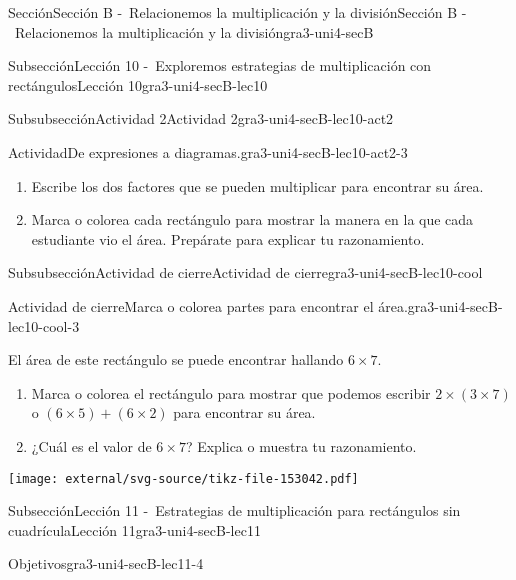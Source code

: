 \documentclass[twoside,14pt,]{extarticle}
\begin{document}
\begin{sectionptx}{Sección}{Sección B -~Relacionemos la multiplicación y la división}{}{Sección B -~Relacionemos la multiplicación y la división}{}{}{gra3-uni4-secB}
\begin{subsectionptx}{Subsección}{Lección 10 -~Exploremos estrategias de multiplicación con rectángulos}{}{Lección 10}{}{}{gra3-uni4-secB-lec10}
\begin{subsubsectionptx}{Subsubsección}{Actividad 2}{}{Actividad 2}{}{}{gra3-uni4-secB-lec10-act2}
\begin{activity}{Actividad}{De expresiones a diagramas.}{gra3-uni4-secB-lec10-act2-3}
%
\begin{enumerate}
\item{}Escribe los dos factores que se pueden multiplicar para encontrar su área.%
\item{}Marca o colorea cada rectángulo para mostrar la manera en la que cada estudiante vio el área. Prepárate para explicar tu razonamiento.%
\end{enumerate}
\end{activity}%
\end{subsubsectionptx}
%
%
\typeout{************************************************}
\typeout{************************************************}
%
\begin{subsubsectionptx}{Subsubsección}{Actividad de cierre}{}{Actividad de cierre}{}{}{gra3-uni4-secB-lec10-cool}
\begin{project}{Actividad de cierre}{Marca o colorea partes para encontrar el área.}{gra3-uni4-secB-lec10-cool-3}%
\begin{sidebyside}{2}{0}{0}{0}%
\begin{sbspanel}{0.6}%
El área de este rectángulo se puede encontrar hallando \(6 \times 7\).%
%
\begin{enumerate}
\item{}Marca o colorea el rectángulo para mostrar que podemos escribir \(2 \times (3 \times 7)\) o \((6 \times 5) + (6 \times 2)\) para encontrar su área.%
\item{}¿Cuál es el valor de \(6 \times 7\)? Explica o muestra tu razonamiento.%
\end{enumerate}
\end{sbspanel}%
\begin{sbspanel}{0.4}%
\texttt{[image: external/svg-source/tikz-file-153042.pdf]}
\end{sbspanel}%
\end{sidebyside}%
\end{project}%
\end{subsubsectionptx}
\end{subsectionptx}
%
%
\typeout{************************************************}
\typeout{************************************************}
%
\begin{subsectionptx}{Subsección}{Lección 11 -~Estrategias de multiplicación para rectángulos sin cuadrícula}{}{Lección 11}{}{}{gra3-uni4-secB-lec11}
\begin{objectives}{Objetivos}{gra3-uni4-secB-lec11-4}

\end{objectives}
\end{subsectionptx}
\end{sectionptx}
\end{document}
